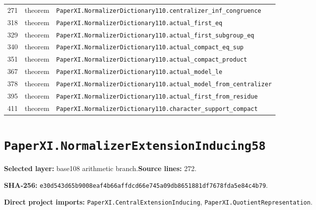\documentclass[10pt,oneside]{book}
\begin{document}
\begin{longtable}{@{}p{}p{}p{}@{}}
271&theorem&\nolinkurl{PaperXI.NormalizerDictionary110.centralizer_inf_congruence}\\

318&theorem&\nolinkurl{PaperXI.NormalizerDictionary110.actual_first_eq}\\

329&theorem&\nolinkurl{PaperXI.NormalizerDictionary110.actual_first_subgroup_eq}\\

340&theorem&\nolinkurl{PaperXI.NormalizerDictionary110.actual_compact_eq_sup}\\

351&theorem&\nolinkurl{PaperXI.NormalizerDictionary110.actual_compact_product}\\

367&theorem&\nolinkurl{PaperXI.NormalizerDictionary110.actual_model_le}\\

378&theorem&\nolinkurl{PaperXI.NormalizerDictionary110.actual_model_from_centralizer}\\

395&theorem&\nolinkurl{PaperXI.NormalizerDictionary110.actual_first_from_residue}\\

411&theorem&\nolinkurl{PaperXI.NormalizerDictionary110.character_support_compact}\\

\bottomrule\end{longtable}

\section{\texorpdfstring{\nolinkurl{PaperXI.NormalizerExtensionInducing58}}{PaperXI.NormalizerExtensionInducing58}}\label{module:PaperXI.NormalizerExtensionInducing58}

\textbf{Selected layer:} base108 arithmetic branch.\quad\textbf{Source lines:} 272.\par\textbf{SHA-256:} {\scriptsize\nolinkurl{e30d543d65b9008eaf4b66affdcd66e745a09db8651881df7678fda5e84c4b79}}.


\textbf{Direct project imports:} \nolinkurl{PaperXI.CentralExtensionInducing}, \nolinkurl{PaperXI.QuotientRepresentation}.
\end{document}
